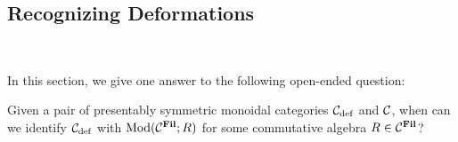 





\subsection{Recognizing Deformations} \label{app:compare}\ 

In this section, we give one answer to the following open-ended question:

\begin{qst}
  Given a pair of presentably symmetric monoidal categories $\mathcal{C}_{\mathrm{def}}$ and $\mathcal{C}$,
  when can we identify $\mathcal{C}_{\mathrm{def}}$ with $\mathrm{Mod}(\mathcal{C}^{\operatorname{\mathbf{Fil}}}; R)$ for some commutative algebra $R \in \mathcal{C}^{\operatorname{\mathbf{Fil}}}$?
\end{qst}


